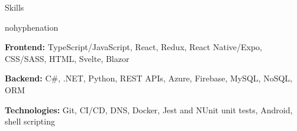 \documentclass[
	10pt, %
]{article} %
\begin{document}
\printname

\begin{rSection}{Skills}
	\begin{hyphenrules}{nohyphenation}

		\begin{rSubsection}{}{}{}{}
			\item[] \textbf{Frontend:} TypeScript/JavaScript, React, Redux, React Native/Expo, CSS/SASS, HTML, Svelte, Blazor
			\item[] \textbf{Backend:} C\#, .NET, Python, REST APIs, Azure, Firebase, MySQL, NoSQL, ORM
			\item[] \textbf{Technologies:} Git, CI/CD, DNS, Docker, Jest and NUnit unit tests, Android, shell scripting
		\end{rSubsection}

	\end{hyphenrules}
\end{rSection}
\end{document}
